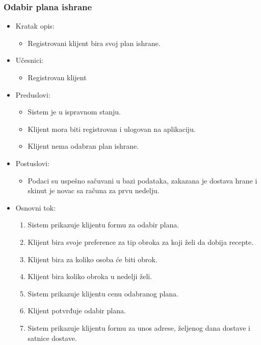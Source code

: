 \subsubsection{Odabir plana ishrane}

\begin{itemize}
    \item Kratak opis:
        \begin{itemize}
            \item Registrovani klijent bira svoj plan ishrane.
        \end{itemize}
    \item Učesnici:
        \begin{itemize}
            \item Registrovan klijent
        \end{itemize}
    \item Preduslovi:
        \begin{itemize}
            \item Sistem je u ispravnom stanju.
            \item Klijent mora biti registrovan i ulogovan na aplikaciju.
            \item Klijent nema odabran plan ishrane.
        \end{itemize}
    \item Postuslovi:
        \begin{itemize}
            \item Podaci su uspešno sačuvani u bazi podataka, zakazana je dostava hrane i skinut je novac sa računa za prvu nedelju.
        \end{itemize}
    \item Osnovni tok:
        \begin{enumerate}
            \item Sistem prikazuje klijentu formu za odabir plana.
            \item Klijent bira svoje preference za tip obroka za koji želi da dobija recepte.
            \item Klijent bira za koliko osoba će biti obrok.
            \item Klijent bira koliko obroka u nedelji želi.
            \item Sistem prikazuje klijentu cenu odabranog plana.
            \item Klijent potvrđuje odabir plana.
            \item Sistem prikazuje klijentu formu za unos adrese, željenog dana dostave i satnice dostave.

\end{enumerate}
\end{itemize}
